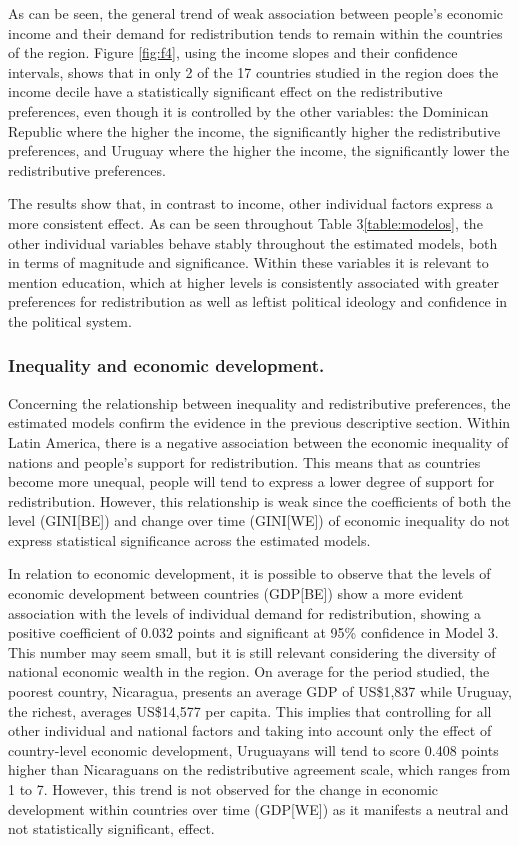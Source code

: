 \documentclass[utf8]{frontiersSCNS} %
\begin{document}
As can be seen, the general trend of weak association between people’s economic income and their demand for redistribution tends to remain within the countries of the region. Figure \ref{fig:f4}, using the income slopes and their confidence intervals, shows that in only 2 of the 17 countries studied in the region does the income decile have a statistically significant effect on the redistributive preferences, even though it is controlled by the other variables: the Dominican Republic where the higher the income, the significantly higher the redistributive preferences, and Uruguay where the higher the income, the significantly lower the redistributive preferences.

The results show that, in contrast to income, other individual factors express a more consistent effect. As can be seen throughout Table 3\ref{table:modelos}, the other individual variables behave stably throughout the estimated models, both in terms of magnitude and significance. Within these variables it is relevant to mention education, which at higher levels is consistently associated with greater preferences for redistribution as well as leftist political ideology and confidence in the political system.

\subsubsection{Inequality and economic development.}

Concerning the relationship between inequality and redistributive preferences, the estimated models confirm the evidence in the previous descriptive section. Within Latin America, there is a negative association between the economic inequality of nations and people’s support for redistribution. This means that as countries become more unequal, people will tend to express a lower degree of support for redistribution. However, this relationship is weak since the coefficients of both the level (GINI[BE]) and change over time (GINI[WE]) of economic inequality do not express statistical significance across the estimated models.

In relation to economic development, it is possible to observe that the levels of economic development between countries (GDP[BE]) show a more evident association with the levels of individual demand for redistribution, showing a positive coefficient of 0.032 points and significant at 95\% confidence in Model 3. This number may seem small, but it is still relevant considering the diversity of national economic wealth in the region. On average for the period studied, the poorest country, Nicaragua, presents an average GDP of US\$1,837 while Uruguay, the richest, averages US\$14,577 per capita. This implies that controlling for all other individual and national factors and taking into account only the effect of country-level economic development, Uruguayans will tend to score 0.408 points higher than Nicaraguans on the redistributive agreement scale, which ranges from 1 to 7. However, this trend is not observed for the change in economic development within countries over time (GDP[WE]) as it manifests a neutral and not statistically significant, effect.
\end{document}
